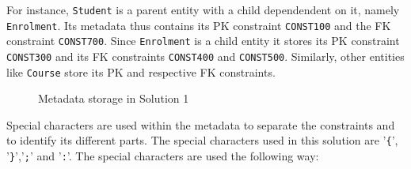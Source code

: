	For instance, \texttt{Student}  is a parent entity with a child dependendent on
	it, namely \texttt{Enrolment}. 
	Its metadata thus contains its \ac{PK} constraint \texttt{CONST100} and the
	\ac{FK} constraint \texttt{CONST700}. Since
	\texttt{Enrolment} is a child entity it  stores its \ac{PK} constraint
	\texttt{CONST300} and its \ac{FK} constraints \texttt{CONST400} and
	\texttt{CONST500}. Similarly, other entities like \texttt{Course} store its
	\ac{PK} and respective \ac{FK} constraints.
	
		\begin{figure}[H] \label{fd:Metadata-Solution1}
			\centering
			\caption{Metadata storage in Solution 1}
		\end{figure}
	Special characters are used within the metadata to separate the constraints and
	to identify its different parts. The special characters used in this solution
	are '\texttt{\{}', '\texttt{\}}','\texttt{;}' and '\texttt{:}'. The special
	characters are used the following way:
	
